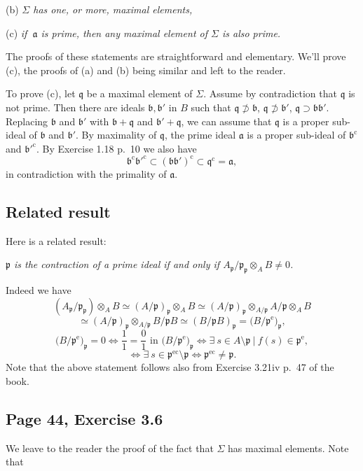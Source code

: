 \documentclass[parskip=half,fontsize=12pt]{scrartcl}%
\newcommand{\oo}{\operatorname}\newcommand{\ooo}{\operatorname*}
\newcommand{\mf}{\mathfrak}
\newcommand{\aaa}{\mf a}
\newcommand{\bbb}{\mf b}
\newcommand{\ppp}{\mf p}
\begin{document}
(b) \emph{$\Sigma$ has one, or more, maximal elements,}

(c) \emph{if $\ \aaa$ is prime, then any maximal element of $\Sigma$ is also prime.}

The proofs of these statements are straightforward and elementary. We'll prove (c), the proofs of (a) and (b) being similar and left to the reader.

To prove (c), let $\mf q$ be a maximal element of $\Sigma$. Assume by contradiction that $\mf q$ is not prime. Then there are ideals $\mf{b,b}'$ in $B$ such that $\mf q\not\supset\mf b$, $\mf q\not\supset\mf b'$, $\mf q\supset\mf{bb}'$. Replacing $\mf b$ and $\mf b'$ with $\mf b+\mf q$ and $\mf b'+\mf q$, we can assume that $\mf q$ is a proper sub-ideal of $\bbb$ and $\bbb'$. By maximality of $\mf q$, the prime ideal $\aaa$ is a proper sub-ideal of $\bbb^{\oo c}$ and $\bbb'^{\oo c}$. By Exercise 1.18 p.~10 we also have 
$$
\bbb^{\oo c}\bbb'^{\oo c}\subset(\mf{bb}')^{\oo c}\subset\mf q^{\oo c}=\aaa,
$$ 
in contradiction with the primality of $\aaa$.

\subsection{Related result}\label{res}

Here is a related result:

\emph{$\ppp$ is the contraction of a prime ideal if and only if $A_\ppp/\ppp_\ppp\otimes_AB\ne0$.}

Indeed we have 
$$
(A_\ppp/\ppp_\ppp)\otimes_AB\simeq(A/\ppp)_\ppp\otimes_AB\simeq(A/\ppp)_\ppp\otimes_{A/\ppp}A/\ppp\otimes_AB
$$ 
$$
\simeq(A/\ppp)_\ppp\otimes_{A/\ppp}B/\ppp B\simeq(B/\ppp B)_\ppp=\big(B/\ppp^{\oo e}\big)_\ppp,
$$ 
$$
\big(B/\ppp^{\oo e}\big)_\ppp=0\iff\frac11=\frac01\text{ in }\big(B/\ppp^{\oo e}\big)_\ppp\iff\exists\ s\in A\setminus\ppp\ |\ f(s)\in\ppp^{\oo e},
$$ 
$$
\iff\exists\ s\in\ppp^{\oo{ec}}\setminus\ppp\iff\ppp^{\oo{ec}}\ne\ppp.
$$ 
Note that the above statement follows also from Exercise 3.21iv p.~47 of the book.

\subsection{Page 44, Exercise 3.6}%

We leave to the reader the proof of the fact that $\Sigma$ has maximal elements. Note that 
\end{document}
